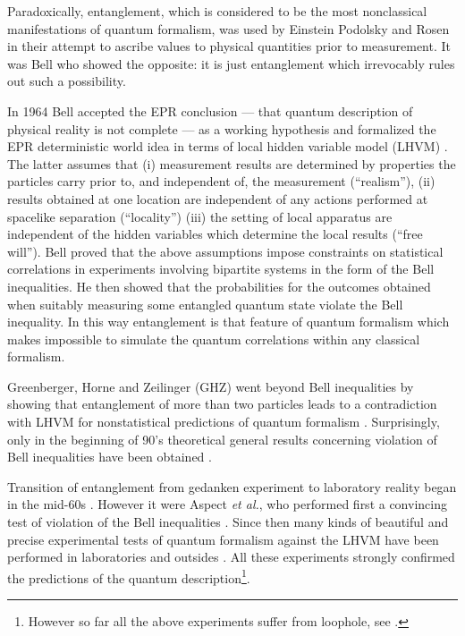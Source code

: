 \documentclass[rmp,12pt,preprint]{revtex4-2}
\begin{document}
Paradoxically, entanglement, which is considered to be the most
nonclassical manifestations of quantum formalism, was used by Einstein
Podolsky and Rosen in their attempt to ascribe values to physical
quantities prior to measurement. It was Bell who showed the opposite:
it is just entanglement which irrevocably rules out such a
possibility.

In 1964 Bell accepted the EPR conclusion --- that quantum description
of physical reality is not complete --- as a working hypothesis and
formalized the EPR deterministic world idea in terms of local hidden
variable model (LHVM) \cite {Bell}. The latter assumes that (i)
measurement results are determined by properties the particles carry
prior to, and independent of, the measurement (``realism''), (ii)
results obtained at one location are independent of any actions
performed at spacelike separation (``locality'') (iii) the setting of
local apparatus are independent of the hidden variables which
determine the local results (``free will''). Bell proved that the
above assumptions impose constraints on statistical correlations in
experiments involving bipartite systems in the form of the Bell
inequalities. He then showed that the probabilities for the outcomes
obtained when suitably measuring some entangled quantum state violate
the Bell inequality. In this way entanglement is that feature of
quantum formalism which makes impossible to simulate the quantum
correlations within any classical formalism.

Greenberger, Horne and Zeilinger (GHZ) went beyond Bell inequalities
by showing that entanglement of more than two particles leads to a
contradiction with LHVM for nonstatistical predictions of quantum
formalism \cite {GHZk}. Surprisingly, only in the beginning of 90's
theoretical general results concerning violation of Bell inequalities
have been obtained \cite{Gisin, Popescu}.

Transition of entanglement from gedanken experiment to laboratory
reality began in the mid-60s \cite {Kocher,Freedman}. However it were
Aspect \emph{et al.}, who performed first a convincing test of
violation of the Bell inequalities \cite {AspectD,AspectGR81}. Since
then many kinds of beautiful and precise experimental tests of quantum
formalism against the LHVM have been performed in laboratories \cite
{KwiatMWZSS,OuM,Bovino2,Rowe,HasegawaLBMH} and outsides \cite
{TittelBGZ1,TittelBGZ2,WeihsRWZ,144km}. All these experiments strongly
confirmed the predictions of the quantum description\footnote {However
  so far all the above experiments suffer from loophole, see \cite
  {Gill,BrunnerGSS2007}.}.
\end{document}
